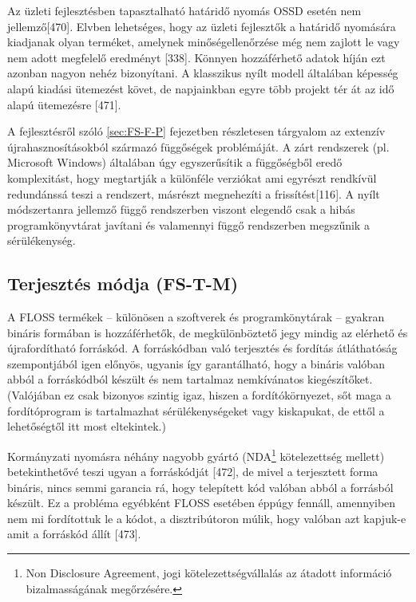 \documentclass[12pt,magyar,a4paper,oneside]{scrreprt}
\begin{document}
Az üzleti fejlesztésben tapasztalható határidő nyomás OSSD esetén nem
jellemző{[}470{]}. Elvben lehetséges, hogy az üzleti fejlesztők a
határidő nyomására kiadjanak olyan terméket, amelynek minőségellenőrzése
még nem zajlott le vagy nem adott megfelelő eredményt {[}338{]}. Könnyen
hozzáférhető adatok híján ezt azonban nagyon nehéz bizonyítani. A
klasszikus nyílt modell általában képesség alapú kiadási ütemezést
követ, de napjainkban egyre több projekt tér át az idő alapú ütemezésre
{[}471{]}.

A fejlesztésről szóló \ref{sec:FS-F-P} fejezetben részletesen tárgyalom
az extenzív újrahasznosításokból származó függőségek problémáját. A zárt
rendszerek (pl. Microsoft Windows) általában úgy egyszerűsítik a
függőségből eredő komplexitást, hogy megtartják a különféle verziókat
ami egyrészt rendkívül redundánssá teszi a rendszert, másrészt
megnehezíti a frissítést{[}116{]}. A nyílt módszertanra jellemző függő
rendszerben viszont elegendő csak a hibás programkönyvtárat javítani és
valamennyi függő rendszerben megszűnik a sérülékenység.

\hypertarget{sec:FS-T-M}{%
\subsection{Terjesztés módja (FS-T-M)}\label{sec:FS-T-M}}

A FLOSS termékek -- különösen a szoftverek és programkönytárak --
gyakran bináris formában is hozzáférhetők, de megkülönböztető jegy
mindig az elérhető és újrafordítható forráskód. A forráskódban való
terjesztés és fordítás átláthatóság szempontjából igen előnyös, ugyanis
így garantálható, hogy a bináris valóban abból a forráskódból készült és
nem tartalmaz nemkívánatos kiegészítőket. (Valójában ez csak bizonyos
szintig igaz, hiszen a fordítókörnyezet, sőt maga a fordítóprogram is
tartalmazhat sérülékenységeket vagy kiskapukat, de ettől a lehetőségtől
itt most eltekintek.)

Kormányzati nyomásra néhány nagyobb gyártó (NDA\footnote{Non Disclosure
  Agreement, jogi kötelezettségvállalás az átadott információ
  bizalmasságának megőrzésére.} kötelezettség mellett) betekinthetővé
teszi ugyan a forráskódját {[}472{]}, de mivel a terjesztett forma
bináris, nincs semmi garancia rá, hogy telepített kód valóban abból a
forrásból készült. Ez a probléma egyébként FLOSS esetében éppúgy
fennáll, amennyiben nem mi fordítottuk le a kódot, a disztribútoron
múlik, hogy valóban azt kapjuk-e amit a forráskód állít {[}473{]}.
\end{document}
